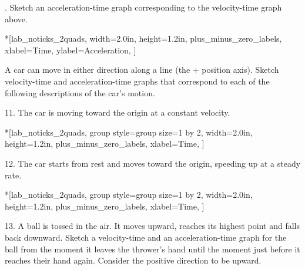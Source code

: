 . Sketch an acceleration-time graph corresponding to the velocity-time graph above.

\begin{lab_axis}*[lab_noticks_2quads,
	width=2.0in,  height=1.2in,
	plus_minus_zero_labels,
	xlabel=Time,
	ylabel=Acceleration,
	]
\end{lab_axis}

A car can move in either direction along a line (the + position axis). Sketch
velocity-time and acceleration-time graphs that correspond to each of the following descriptions of the car's motion.

11. The car is moving toward the origin at a constant velocity.

\begin{lab_groupplot}*{}[lab_noticks_2quads,
	group style={group size=1 by 2},
	width=2.0in,  height=1.2in,
	plus_minus_zero_labels,
	xlabel=Time,
	]
\nextgroupplot[
	ylabel=Velocity,
	]
\nextgroupplot[
	ylabel=Acceleration,
	]
\end{lab_groupplot}

12. The car starts from rest and moves toward the origin, speeding up at a steady
rate.

\begin{lab_groupplot}*{}[lab_noticks_2quads,
	group style={group size=1 by 2},
	width=2.0in,  height=1.2in,
	plus_minus_zero_labels,
	xlabel=Time,
	]
\nextgroupplot[
	ylabel=Velocity,
	]
\nextgroupplot[
	ylabel=Acceleration,
	]
\end{lab_groupplot}

13. A ball is tossed in the air. It moves upward, reaches its highest point
and falls back downward. Sketch a velocity-time and an acceleration-time graph for the ball from the moment it leaves the thrower's hand until the moment just before it reaches their hand again. Consider the positive direction to be upward.

